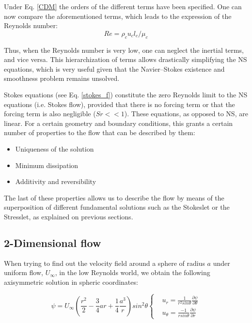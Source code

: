 Under Eq. \ref{CDM} the orders of the different terms have been specified. One can now compare the aforementioned terms, which leads to the expression of the Reynolds number:
\begin{equation}
	Re = \rho_c u_c l_c/\mu_c
\end{equation}

Thus, when the Reynolds number is very low, one can neglect the inertial terms, and vice versa. This hierarchization of terms allows drastically simplifying the NS equations, which is very useful given that the Navier–Stokes existence and smoothness problem remains unsolved.

Stokes equations (see Eq. \ref{stokes_f}) constitute the zero Reynolds limit to the NS equations (i.e. Stokes flow), provided that there is no forcing term or that the forcing term is also negligible ($Sr<<1$). These equations, as opposed to NS, are linear. For a certain geometry and boundary conditions, this grants a certain number of properties to the flow that can be described by them:

\begin{itemize}
	\item Uniqueness of the solution  
	\item Minimum dissipation
	\item Additivity and reversibility
\end{itemize}

The last of these properties allows us to describe the flow by means of the superposition of different fundamental solutions such as the Stokeslet or the Stresslet, as explained on previous sections.

\subsection{2-Dimensional flow}

When trying to find out the velocity field around a sphere of radius $a$ under uniform flow, $U_\infty$, in the low Reynolds world, we obtain the following axisymmetric solution in spheric coordinates:

\begin{equation}
\psi = U_\infty \left(\frac{r^2}{2} - \frac{3}{4}ar + \frac{1}{4} \frac{a^3}{r} \right) sin ^2 \theta
\left\{
\begin{aligned}
& u_r = \frac{1}{r^2 sin \theta} \frac{\partial \psi}{\partial \theta}\\
& u_\theta = \frac{-1}{r sin \theta} \frac{\partial \psi}{\partial r}
\end{aligned}
\right.
\end{equation}

